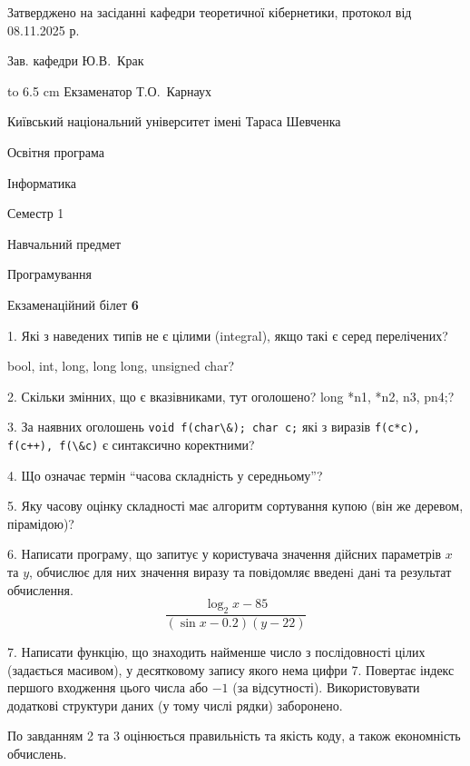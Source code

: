 \documentclass[12pt, ukrainian]{article}
\def\code#1{\Verb!#1!}
\begin{document}
{\smallskip\smallskip \begin {scriptsize} Затверджено на засіданні кафедри теоретичної кібернетики, протокол   від   08.11.2025 р.\par\smallskip\smallskip\smallskip\smallskip
{\parbox {6.5 cm} {Зав. кафедри \dotfill Ю.В.~Крак}}\hspace {0.7cm} {\hbox to 6.5 cm { Екзаменатор \dotfill Т.О.~Карнаух}} \end{scriptsize}}
\vspace{0.9cm}
{{\begin {scriptsize}\par
{ \center  Київський національний університет імені Тараса Шевченка \par}
{\parbox {5 cm}{Освітня програма \hfill}{\parbox {7 cm}{Інформатика\hfill}}\parbox {6 cm}{\hfill Семестр 1}}\par
{\parbox {5 cm} {Навчальний предмет \hfill}\parbox {7 cm}{Програмування \hfill}\parbox {6cm}{\hfill}\par}\vspace{-15pt} \end{scriptsize}}{\center Екзаменаційний білет \No \textbf { 6 }\par}}
{%
1. Які з наведених типів не є цілими (integral), якщо такі є серед перелічених?

bool, int, long, long long, unsigned char?
\par
\vspace{2mm}
2. Скільки змінних, що є вказівниками, тут оголошено?
long *n1, *n2, n3, pn4;?
\par
\vspace{2mm}
3. За наявних оголошень \code{void f(char\&); char c;} які з виразів \code{f(c*c), f(c++), f(\&c)} є синтаксично коректними?
\par
\vspace{2mm}
4. Що означає термін ``часова складність у середньому''?
\par
\vspace{2mm}
5. Яку часову оцінку складності має алгоритм сортування купою (він же деревом, пірамідою)?
\par
\vspace{2mm}
6. Написати програму, що запитує у користувача значення дійсних параметрів $x$ та $y$, обчислює для них значення виразу та повiдомляє введенi данi та результат обчислення.
$$\frac{\log_{2} x - 85}{(\sin x - 0.2) (y - 22)}$$ 

\par
7. Написати функцію, що знаходить найменше число з послідовності цілих (задається масивом), у десятковому запису якого нема цифри 7. Повертає індекс першого входження цього числа або $-1$ (за відсутності). Використовувати додаткові структури даних (у тому числі рядки) заборонено.

По завданням 2 та 3 оцінюється правильність та якість коду, а також економність обчислень.

}
\end{document}
